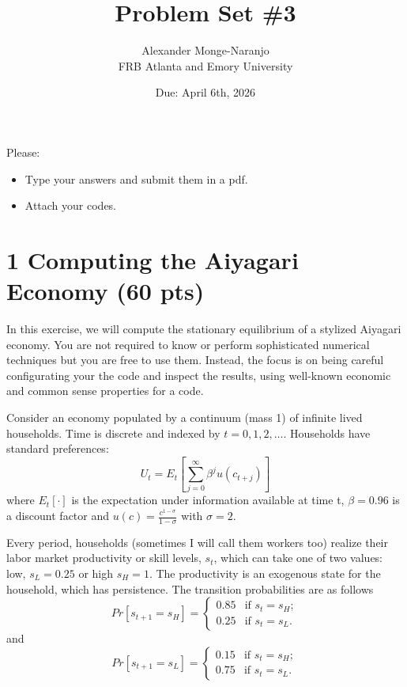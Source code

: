 \documentclass{article}
\title{Problem Set \#3}
\author{Alexander Monge-Naranjo \\ FRB Atlanta and Emory University}
\date{Due: April 6th, 2026}
\begin{document}
\maketitle

Please:
\begin{itemize}
    \item Type your answers and submit them in a pdf.
    \item Attach your codes.
\end{itemize}

\section*{1 Computing the Aiyagari Economy (60 pts)}

In this exercise, we will compute the stationary equilibrium of a stylized Aiyagari economy.
You are not required to know or perform sophisticated numerical techniques but you are free to use them.
Instead, the focus is on being careful configurating your the code and inspect the results, using well-known economic and common sense properties for a code.

Consider an economy populated by a continuum (mass 1) of infinite lived households.
Time is discrete and indexed by $t=0,1,2,\dots$. Households have standard preferences:
\begin{equation*}
U_{t}=E_{t}\left[\sum_{j=0}^{\infty}\beta^{j}u(c_{t+j})\right]
\end{equation*}
where $E_{t}[\cdot]$ is the expectation under information available at time t, $\beta=0.96$ is a discount factor and $u(c)=\frac{c^{1-\sigma}}{1-\sigma}$ with $\sigma=2$.

Every period, households (sometimes I will call them workers too) realize their labor market productivity or skill levels, $s_{t}$, which can take one of two values: low, $s_{L}=0.25$ or high $s_{H}=1$. The productivity is an exogenous state for the household, which has persistence.
The transition probabilities are as follows
\begin{equation*}
Pr[s_{t+1}=s_{H}]=\begin{cases}0.85&\text{if } s_{t}=s_{H};\\ 0.25&\text{if } s_{t}=s_{L}.\end{cases}
\end{equation*}
and
\begin{equation*}
Pr[s_{t+1}=s_{L}]=\begin{cases}0.15&\text{if } s_{t}=s_{H};\\ 0.75&\text{if } s_{t}=s_{L}.\end{cases}
\end{equation*}
\end{document}
